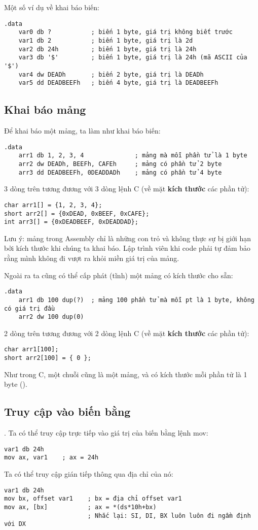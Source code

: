 \documentclass[main.tex]{subfiles}
\begin{document}
Một số ví dụ về khai báo biến:
\begin{verbatim}
.data 
    var0 db ?           ; biến 1 byte, giá trị không biết trước
    var1 db 2           ; biến 1 byte, giá trị là 2d
    var2 db 24h         ; biến 1 byte, giá trị là 24h
    var3 db '$'         ; biến 1 byte, giá trị là 24h (mã ASCII của '$')
    var4 dw DEADh       ; biến 2 byte, giá trị là DEADh
    var5 dd DEADBEEFh   ; biến 4 byte, giá trị là DEADBEEFh
\end{verbatim}

\subsection{Khai báo mảng}
Để khai báo một mảng, ta làm như khai báo biến:
\begin{verbatim}
.data
    arr1 db 1, 2, 3, 4              ; mảng mà mỗi phần tử là 1 byte
    arr2 dw DEADh, BEEFh, CAFEh     ; mảng có phần tử 2 byte
    arr3 dd DEADBEEFh, 0DEADDADh    ; mảng có phần tử 4 byte
\end{verbatim}
3 dòng trên tương đương với 3 dòng lệnh C (về mặt \textbf{kích thước} các phần tử):
\begin{verbatim}
char arr1[] = {1, 2, 3, 4};
short arr2[] = {0xDEAD, 0xBEEF, 0xCAFE};
int arr3[] = {0xDEADBEEF, 0xDEADDAD};
\end{verbatim}

Lưu ý: mảng trong Assembly chỉ là những con trỏ và không thực sự bị giới hạn bởi kích thước khi chúng ta khai báo. Lập trình viên khi code phải tự đảm bảo rằng mình không đi vượt ra khỏi miền giá trị của mảng.

Ngoài ra ta cũng có thể cấp phát (tĩnh) một mảng có kích thước cho sẵn:
\begin{verbatim}
.data
    arr1 db 100 dup(?)  ; mảng 100 phần tử mà mỗi pt là 1 byte, không có giá trị đầu
    arr2 dw 100 dup(0)
\end{verbatim}
2 dòng trên tương đương với 2 dòng lệnh C (về mặt \textbf{kích thước} các phần tử):
\begin{verbatim}
char arr1[100];
short arr2[100] = { 0 }; 
\end{verbatim}

Như trong C, một chuỗi cũng là một mảng, và có kích thước mỗi phần tử là 1 byte ().

\subsection{Truy cập vào biến bằng }.
Ta có thể truy cập trực tiếp vào giá trị của biến bằng lệnh mov:
\begin{verbatim}
var1 db 24h
mov ax, var1    ; ax = 24h
\end{verbatim}
Ta có thể truy cập gián tiếp thông qua địa chỉ của nó:
\begin{verbatim}
var1 db 24h            
mov bx, offset var1    ; bx = địa chỉ offset var1
mov ax, [bx]           ; ax = *(ds*10h+bx) 
                       ; Nhắc lại: SI, DI, BX luôn luôn đi ngầm định với DX
\end{verbatim}
\end{document}
